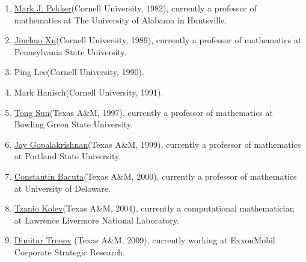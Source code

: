 \begin{enumerate}
\item \href{https://www.uah.edu/science/departments/math/faculty-staff/mark-pekker}{Mark J. Pekker}(Cornell University, 1982), currently a professor of mathematics at The University of Alabama in Huntsville.
\item \href{https://www.personal.psu.edu/jxx1/}{Jinchao Xu}(Cornell University, 1989), currently a professor of mathematics at Pennsylvania State University. 
\item Ping Lee(Cornell University, 1990).
\item Mark Hanisch(Cornell University, 1991).
\item \href{https://www.bgsu.edu/arts-and-sciences/mathematics-and-statistics/faculty-and-staff/tong-sun.html}{Tong Sun}(Texas A\&M, 1997), currently a professor of mathematics at Bowling Green State University.
\item \href{http://web.pdx.edu/~gjay/}{Jay Gopalakrishnan}(Texas A\&M, 1999), currently a professor of mathematics at Portland State University.
\item \href{http://www.math.udel.edu/~bacuta/}{Constantin Bacuta}(Texas A\&M, 2000), currently a professor of mathematics at University of Delaware.
\item \href{https://people.llnl.gov/kolev1}{Tzanio Kolev}(Texas A\&M, 2004), currently a computational mathematician at Lawrence Livermore National Laboratory.
\item \href{https://scholar.google.com/citations?user=EeWTb_wAAAAJ&hl=en}{Dimitar Trenev} (Texas A\&M, 2009), currently working at ExxonMobil Corporate Strategic Research.
\end{enumerate}
